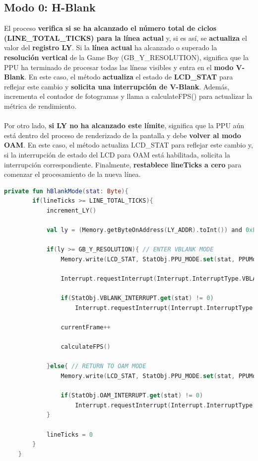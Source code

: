 \subsection{Modo 0: H-Blank}

El proceso \textbf{verifica si se ha alcanzado el número total de ciclos \\
(LINE\_TOTAL\_TICKS) para la línea actual} y, si es así, se \textbf{actualiza} el valor del \textbf{registro LY}. Si la \textbf{línea actual} ha alcanzado o superado la \textbf{resolución vertical} de la Game Boy (GB\_Y\_RESOLUTION), significa que la PPU ha terminado de procesar todas las líneas visibles y entra en el \textbf{modo V-Blank}. En este caso, el método \textbf{actualiza} el estado de \textbf{LCD\_STAT} para reflejar este cambio y \textbf{solicita una interrupción de V-Blank}. Además, incrementa el contador de fotogramas y llama a calculateFPS() para actualizar la métrica de rendimiento.
\\\\
Por otro lado, \textbf{si LY no ha alcanzado este límite}, significa que la PPU aún está dentro del proceso de renderizado de la pantalla y debe \textbf{volver al modo OAM}. En este caso, el método actualiza LCD\_STAT para reflejar este cambio y, si la interrupción de estado del LCD para OAM está habilitada, solicita la interrupción correspondiente. Finalmente, \textbf{restablece lineTicks a cero} para comenzar el procesamiento de la nueva línea.

\begin{lstlisting}[language=Kotlin, caption={Lógica del proceso de H-Blank.}, label={code:ppuhblank}]
    private fun hBlankMode(stat: Byte){
        if(lineTicks >= LINE_TOTAL_TICKS){
            increment_LY()

            val ly = (Memory.getByteOnAddress(LY_ADDR).toInt()) and 0xFF

            if(ly >= GB_Y_RESOLUTION){ // ENTER VBLANK MODE
                Memory.write(LCD_STAT, StatObj.PPU_MODE.set(stat, PPUMode.VBlank.number))

                Interrupt.requestInterrupt(Interrupt.InterruptType.VBLANK.getByteMask()) // ASK FOR VBLANK INTERRUPT

                if(StatObj.VBLANK_INTERRUPT.get(stat) != 0)
                    Interrupt.requestInterrupt(Interrupt.InterruptType.LCD_STAT.getByteMask()) // ASK FOR LCD STAT INTERRUPT IF LCD_STAT HAS THE VBLANK BIT ACTIVATED

                currentFrame++

                calculateFPS()

            }else{ // RETURN TO OAM MODE
                Memory.write(LCD_STAT, StatObj.PPU_MODE.set(stat, PPUMode.OAM.number))

                if(StatObj.OAM_INTERRUPT.get(stat) != 0)
                    Interrupt.requestInterrupt(Interrupt.InterruptType.LCD_STAT.getByteMask()) // ASK FOR LCD STAT INTERRUPT IF LCD_STAT HAS THE OAM BIT ACTIVATED
            }

            lineTicks = 0
        }
    }
\end{lstlisting}

